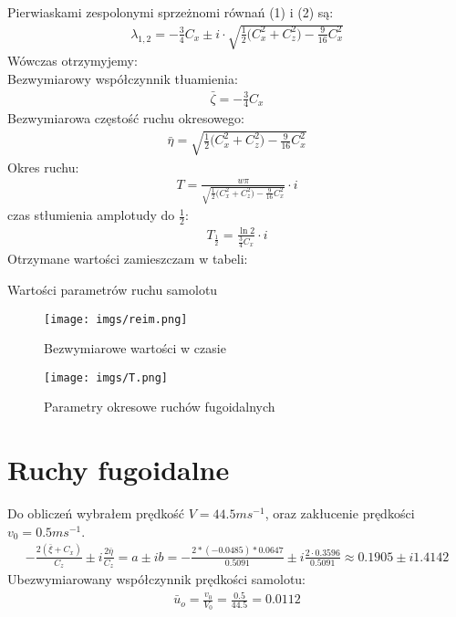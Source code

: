 \documentclass{sprawozdanie}
\begin{document}
Pierwiaskami zespolonymi sprzeżnomi równań (1) i (2) są:
\begin{align*}
    \lambda_{1,2} = -\frac{3}{4} C_x \pm i \cdot \sqrt{\frac{1}{2} \Big( C_x^2+C_z^2 \Big) - \frac{9}{16} C_x^2}
\end{align*}
Wówczas otrzymyjemy:\\
Bezwymiarowy współczynnik tłuamienia:
\begin{align*}
    \bar \zeta = -\frac{3}{4} C_x
\end{align*}
Bezwymiarowa częstość ruchu okresowego:
\begin{align*}
    \bar \eta = \sqrt{\frac{1}{2} \Big( C_x^2+C_z^2 \Big) - \frac{9}{16} C_x^2}
\end{align*}
Okres ruchu:
\begin{align*}
    T = \frac{w \pi}{\sqrt{\frac{1}{2} \Big( C_x^2+C_z^2 \Big) - \frac{9}{16} C_x^2}} \cdot i
\end{align*}
czas stłumienia amplotudy do $\frac{1}{2}$:
\begin{align*}
    T_{\frac{1}{2}} = \frac{\ln 2}{\frac{3}{4}C_x}\cdot i
\end{align*}
Otrzymane wartości zamieszczam w tabeli:
\begin{table}[H]
    \centering
    
    \caption{Wartości parametrów ruchu samolotu}
\end{table}

\begin{figure}[H]
    \centering
    \texttt{[image: imgs/reim.png]}
    \caption{Bezwymiarowe wartości w czasie}
    \label{fig:fig1}
\end{figure}

\begin{figure}[H]
    \centering
    \texttt{[image: imgs/T.png]}
    \caption{Parametry okresowe ruchów fugoidalnych}
\end{figure}

\section{Ruchy fugoidalne}
Do obliczeń wybrałem prędkość $V = 44.5 ms^{-1}$, oraz zakłucenie prędkości $v_0 = 0.5 ms^{-1}$.
\begin{align*}
    -\frac{2(\bar \xi +C_x)}{C_z} \pm i \frac{2\bar \eta}{C_z} = a \pm i b = -\frac{2*(-0.0485)*0.0647}{0.5091} \pm i \frac{2\cdot 0.3596}{0.5091} \approx 0.1905 \pm i 1.4142
\end{align*}
Ubezwymiarowany współczynnik prędkości samolotu:
\begin{align*}
    \bar u_o = \frac{v_0}{V_0} = \frac{0.5}{44.5} = 0.0112
\end{align*}
\end{document}
